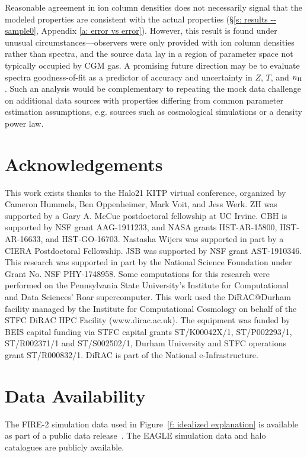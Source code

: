 \documentclass[fleqn,usenatbib]{mnras}
\begin{document}
Reasonable agreement in ion column densities does not necessarily signal that the modeled properties are consistent with the actual properties (\S\ref{s: results -- sample0}, Appendix \ref{a: error vs error}).
However, this result is found under unusual circumstances---observers were only provided with ion column densities rather than spectra, and the source data lay in a region of parameter space not typically occupied by CGM gas.
A promising future direction may be to evaluate spectra goodness-of-fit as a predictor of accuracy and uncertainty in $Z$, $T$, and $n_{\rm H}$.
Such an analysis would be complementary to repeating the mock data challenge on additional data sources with properties differing from common parameter estimation assumptions,
e.g. sources such as cosmological simulations or a density power law.

\section*{Acknowledgements}

This work exists thanks to the Halo21 KITP virtual conference, organized by Cameron Hummels, Ben Oppenheimer, Mark Voit, and Jess Werk.
ZH was supported by a Gary A. McCue postdoctoral fellowship at UC Irvine.
CBH is supported by NSF grant AAG-1911233, and NASA grants HST-AR-15800, HST-AR-16633, and HST-GO-16703.
Nastasha Wijers was supported in part by a CIERA Postdoctoral Fellowship.
JSB was supported by NSF grant AST-1910346.
This research was supported in part by the National Science Foundation under Grant No. NSF PHY-1748958.
Some computations for this research were performed on the Pennsylvania State University's Institute for Computational and Data Sciences' Roar supercomputer.
This work used the DiRAC@Durham facility managed by the Institute for Computational Cosmology on behalf of the STFC DiRAC HPC Facility (www.dirac.ac.uk). The equipment was funded by BEIS capital funding via STFC capital grants ST/K00042X/1, ST/P002293/1, ST/R002371/1 and ST/S002502/1, Durham University and STFC operations grant ST/R000832/1.
DiRAC is part of the National e-Infrastructure.

\section*{Data Availability}

The FIRE-2 simulation data used in Figure~\ref{f: idealized explanation} is available as part of a public data release~\citep{wetzel2022Public}.
The EAGLE simulation data \citep{EagleTeam2017} and halo catalogues \citep{McAlpine2016} are publicly available. 
\end{document}
